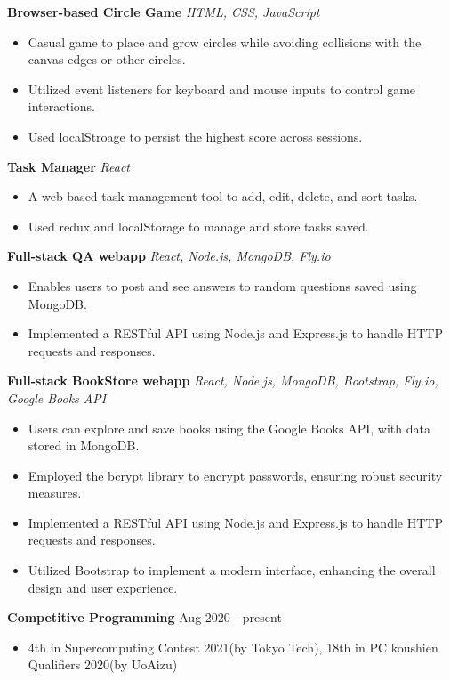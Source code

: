 \documentclass[a4paper,12pt]{article}
\begin{document}
\textbf{Browser-based Circle Game}
\href{https://uliba3.github.io/CircleGame/}{\faGlobe}
\href{https://github.com/uliba3/CircleGame}{\faGithub}
\textit{HTML, CSS, JavaScript}
\begin{itemize}
    \item Casual game to place and grow circles while avoiding collisions with the canvas edges or other circles.
    \item Utilized event listeners for keyboard and mouse inputs to control game interactions.
    \item Used localStroage to persist the highest score across sessions.
\end{itemize}
\textbf{Task Manager}
\href{https://uliba3.github.io/TaskManager/}{\faGlobe}
\href{https://github.com/uliba3/TaskManager}{\faGithub}
\textit{React}
\begin{itemize}
    \item A web-based task management tool to add, edit, delete, and sort tasks.
    \item Used redux and localStorage to manage and store tasks saved.
\end{itemize}
\textbf{Full-stack QA webapp}
\href{https://white-voice-4708.fly.dev/}{\faGlobe}
\href{https://github.com/uliba3/Q-A-backend}{\faGithub}
\textit{React, Node.js, MongoDB, Fly.io}
\begin{itemize}
    \item Enables users to post and see answers to random questions saved using MongoDB.
    \item Implemented a RESTful API using Node.js and Express.js to handle HTTP requests and responses.
\end{itemize}
\textbf{Full-stack BookStore webapp}
\href{https://bookstore-backend.fly.dev/}{\faGlobe}
\href{https://github.com/uliba3/BookStore-backend}{\faGithub}
\textit{React, Node.js, MongoDB, Bootstrap, Fly.io, Google Books API}
\begin{itemize}
    \item Users can explore and save books using the Google Books API, with data stored in MongoDB.
    \item Employed the bcrypt library to encrypt passwords, ensuring robust security measures.
    \item Implemented a RESTful API using Node.js and Express.js to handle HTTP requests and responses.
    \item Utilized Bootstrap to implement a modern interface, enhancing the overall design and user experience.
\end{itemize}

\textbf{Competitive Programming} \hfill \textnormal{Aug 2020 - present}
\begin{itemize}
    \item 4th in Supercomputing Contest 2021(by Tokyo Tech), 18th in PC koushien Qualifiers 2020(by UoAizu)
\end{itemize}
\end{document}
